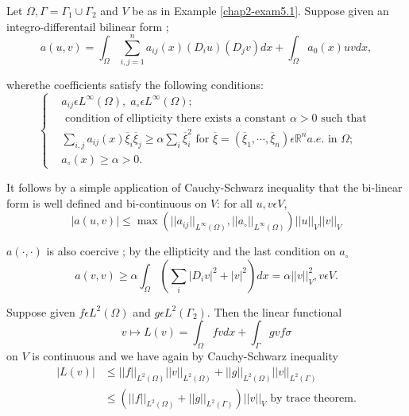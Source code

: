 \begin{dashexam}\label{chap2-exam$(5.1)'$}
Let $\Omega, \Gamma = \Gamma_{1} \cup \Gamma_{2}$ and $V$ be as in Example \ref{chap2-exam5.1}. Suppose given an integro-differentail bilinear form ;
\begin{equation*}
a(u, v) = \int_{\Omega} \sum_{i, j=1}^{n} a_{ij} (x) (D_{i} u) (D_{j} v) dx + \int_{\Omega} a_{0} (x) uv dx,\tag{5.11}\label{chap2-eq5.11}
\end{equation*}
\end{dashexam}
where\pageoriginale the coefficients satisfy the following conditions:
\begin{equation*}
\begin{cases}
& a_{ij} \epsilon L^{\infty} (\Omega), \;  a_{\circ} \epsilon L^{\infty} (\Omega);\\
& \text{ condition of ellipticity there exists a constant } \alpha > 0 \text{ such that }\\
& \sum_{i, j} a_{ij} (x) \overline{\xi}_{i} \overline{\xi}_{j} \geq
  \alpha \sum_{i} \overline{\xi}_{i}^{2} \text{ for } \overline{\xi} =
  (\overline{\xi}_{1}, \cdots , \overline{\xi}_{n}) \epsilon
  \mathbb{R}^{n} a.e. \text{ in } \Omega ;\\
& a_{\circ} (x) \geq \alpha > 0. \tag{5.12}\label{chap2-eq5.12}
\end{cases}
\end{equation*}

It follows by a simple application of Cauchy-Schwarz inequality that the bi-linear form is well defined and bi-continuous on $V$: for all $u, v \epsilon V$,
$$
|a(u, v)| \leq \max (||a_{ij}||_{L^{\infty}(\Omega)}, ||a_{\circ}||_{L^{\infty}(\Omega)}) ||u||_{V} ||v||_{V}
$$

$a(\cdot , \cdot)$ is also coercive ; by the ellipticity and the last condition on $a_{\circ}$
$$
a(v, v) \geq \alpha \int_{\Omega} (\sum_{i} |D_{i}v|^{2} + |v|^{2}) dx = \alpha ||v||_{V}^{2}, v \epsilon V. 
$$

Suppose given $f \epsilon L^{2} (\Omega)$ and $g \epsilon L^{2} (\Gamma_{2})$. Then the linear functional
\begin{equation*}
v \mapsto L(v) = \int_{\Omega} fv dx + \int_{\Gamma} gv f\sigma\tag{5.13}\label{chap2-eq5.13}
\end{equation*}
on $V$ is continuous and we have again by Cauchy-Schwarz inequality
\begin{align*}
|L(v)| & \leq ||f||_{L^{2}(\Omega)} ||v||_{L^{2}(\Omega)} + ||g||_{L^{2}(\Omega)} ||v||_{L^{2}(\Gamma)}\\
& \leq (||f||_{L^{2}(\Omega)} + ||g||_{L^{2}(\Gamma)}) ||v||_{V} \text{ by trace theorem.}
\end{align*}

